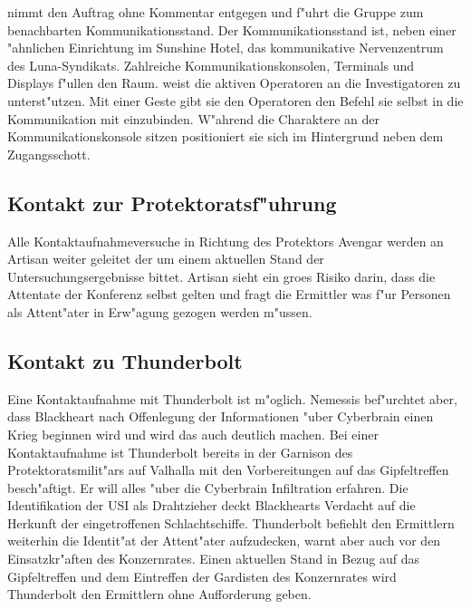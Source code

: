 
\xl{} nimmt den Auftrag ohne Kommentar entgegen und f"uhrt die Gruppe zum benachbarten Kommunikationsstand. Der Kommunikationsstand ist, neben einer "ahnlichen Einrichtung im Sunshine Hotel, das kommunikative Nervenzentrum des Luna-Syndikats. Zahlreiche Kommunikationskonsolen, Terminals und Displays f"ullen den Raum. \xl{} weist die aktiven Operatoren an die Investigatoren zu unterst"utzen. Mit einer Geste gibt sie den Operatoren den Befehl sie selbst in die Kommunikation mit einzubinden. W"ahrend die Charaktere an der Kommunikationskonsole sitzen positioniert sie sich im Hintergrund neben dem Zugangsschott.

\subsection{Kontakt zur Protektoratsf"uhrung} 
Alle Kontaktaufnahmeversuche in Richtung des Protektors Avengar werden an Artisan weiter geleitet der um einem aktuellen Stand der Untersuchungsergebnisse bittet. Artisan sieht ein gro\3es Risiko darin, dass die Attentate der Konferenz selbst gelten und fragt die Ermittler was f"ur Personen als Attent"ater in Erw"agung gezogen werden m"ussen.

\subsection{Kontakt zu Thunderbolt} 
Eine Kontaktaufnahme mit Thunderbolt ist m"oglich. Nemessis bef"urchtet aber, dass Blackheart nach Offenlegung der Informationen "uber Cyberbrain einen Krieg beginnen wird und wird das auch deutlich machen. Bei einer Kontaktaufnahme ist Thunderbolt bereits in der Garnison des Protektoratsmilit"ars auf Valhalla mit den Vorbereitungen auf das Gipfeltreffen besch"aftigt. Er will alles "uber die Cyberbrain Infiltration erfahren. Die Identifikation der USI als Drahtzieher deckt Blackhearts Verdacht auf die Herkunft der eingetroffenen Schlachtschiffe. Thunderbolt befiehlt den Ermittlern weiterhin die Identit"at der Attent"ater aufzudecken, warnt aber auch vor den Einsatzkr"aften des Konzernrates. Einen aktuellen Stand in Bezug auf das Gipfeltreffen und dem Eintreffen der Gardisten des Konzernrates wird Thunderbolt den Ermittlern ohne Aufforderung geben.

